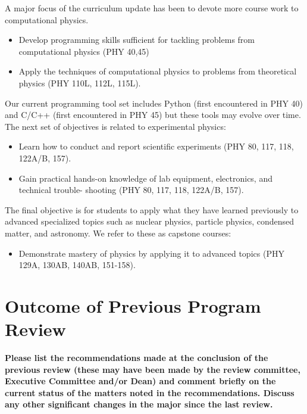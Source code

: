 \documentclass[12pt]{article}
\begin{document}
A major focus of the curriculum update has been to devote more course
work to computational physics.
\begin{itemize} 
 \item Develop programming skills sufficient for tackling problems
   from computational physics (PHY 40,45)
 \item Apply the techniques of computational physics to problems from
   theoretical physics (PHY 110L, 112L, 115L).
\end{itemize}
Our current programming tool set includes Python (first encountered in
PHY 40) and C/C++ (first encountered in PHY 45) but these tools
may evolve over time.  The next set of objectives is related to
experimental physics:
\begin{itemize}
 \item Learn how to conduct and report scientific experiments (PHY 80,
   117, 118, 122A/B, 157).
 \item Gain practical hands-on knowledge of lab equipment,
   electronics, and technical trouble- shooting (PHY 80, 117, 118,
   122A/B, 157).
\end{itemize}
The final objective is for students to apply what they have learned
previously to advanced specialized topics such as nuclear physics,
particle physics, condensed matter, and astronomy.  We refer to these
as capstone courses:
\begin{itemize}
 \item Demonstrate mastery of physics by applying it to advanced
   topics (PHY 129A, 130AB, 140AB, 151-158).
\end{itemize}

\newpage
\section{Outcome of Previous Program Review}
\label{sec:previous}

{\bf Please list the recommendations made at the conclusion of the
  previous review (these may have been made by the review committee,
  Executive Committee and/or Dean) and comment briefly on the current
  status of the matters noted in the recommendations. Discuss any
  other significant changes in the major since the last review.}\\
\end{document}
